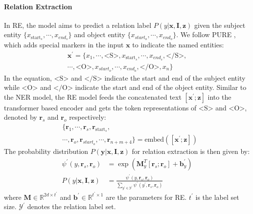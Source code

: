 \documentclass[11pt]{article}
\def\vb{{\bm{b}}}
\def\vr{{\bm{r}}}
\def\vx{{\bm{x}}}
\def\vy{{\bm{y}}}
\def\vz{{\bm{z}}}
\def\mI{{\bm{I}}}
\def\mM{{\bm{M}}}
\def\sR{{\mathbb{R}}}
\begin{document}
\paragraph{Relation Extraction} In RE, the model aims to predict a relation label $P(y|\vx,\mI,\vz)$ given the subject entity $\{x_{\text{start}_s}, \cdots, x_{end_s}\}$ and object entity $\{x_{start_o}, \cdots, x_{end_o}\}$.
We follow PURE \citep{zhong-chen-2021-frustratingly}, which adds special markers in the input $\vx$ to indicate the named entities:
\begin{align*}
\vx^{\prime}= \{x_1, \cdots, \text{<S>}, x_{\text{start}_s}, \cdots, x_{end_s}, \text{</S>},\\ \cdots, \text{<O>}, x_{start_o}, \cdots, x_{end_o}, \text{</O>}, x_n\} 
\end{align*}
In the equation, $\text{<S>}$ and $\text{</S>}$ indicate the start and end of the subject entity while $\text{<O>}$ and $\text{</O>}$ indicate the start and end of the object entity. Similar to the NER model, the RE model feeds the concatenated text $[\vx^{\prime};\vz]$ into the transformer based encoder and gets the token representations of $\text{<S>}$ and $\text{<O>}$, denoted by $\vr_{s}$ and $\vr_{o}$ respectively:
\begin{align*}
&\{\vr_1, \cdots, \vr_{s}, \vr_{\text{start}_s},\\
&\cdots, \vr_{o},  \vr_{start_o}, \cdots, \vr_{n+m+4}\} =\text{embed} ([\vx^{\prime};\vz])
\end{align*}
The probability distribution $P(\vy|\vx,\mI,\vz)$ for relation extraction is then given by:
\begin{align}
    \psi^\prime(y, \vr_s, \vr_o) &= \exp(\mM_{y}^{T} [\vr_s;\vr_o] + \vb^{\prime}_{y}) \nonumber\\
    P(y|\vx,\mI,\vz) &= \frac{\psi^\prime(y, \vr_s, \vr_o)}{\sum\limits_{y^{\prime} \in \mathcal{Y}^\prime} \psi^\prime(y^\prime, \vr_s, \vr_o)}\nonumber
\end{align}
where $\mM\in \sR^{2d\times t^\prime}$ and $\vb^{\prime} \in \sR^{t^\prime \times 1}$ are the parameters for RE. $t^\prime$ is the label set size. $\mathcal{Y}^\prime$ denotes the relation label set.
\end{document}
